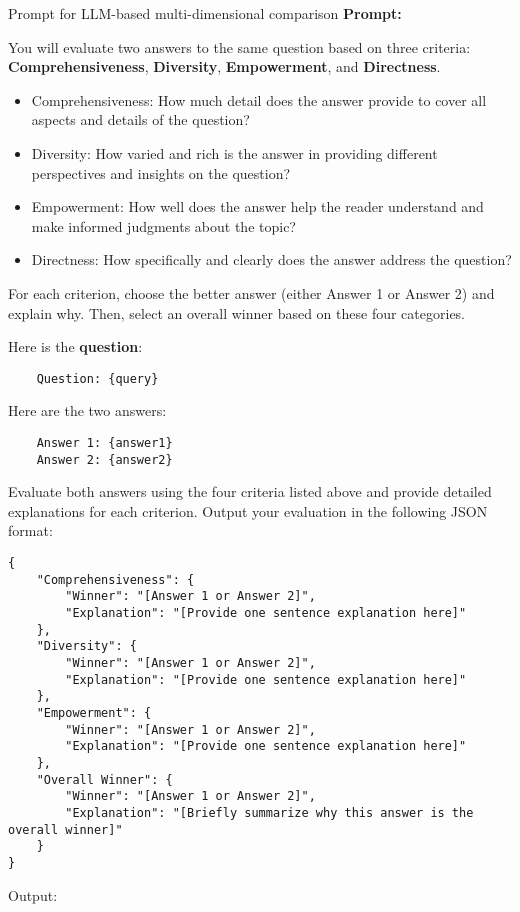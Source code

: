 \begin{figure*}[t] 
\begin{AIbox}{Prompt for LLM-based multi-dimensional comparison}
{\bf Prompt:} \\
{%
You will evaluate two answers to the same question based on three criteria: {\bf Comprehensiveness}, {\bf Diversity}, {\bf Empowerment}, and {\bf Directness}.
\begin{itemize}
    \item Comprehensiveness: How much detail does the answer provide to cover all aspects and details of the question?
    \item Diversity: How varied and rich is the answer in providing different perspectives and insights on the question?
    \item Empowerment: How well does the answer help the reader understand and make informed judgments about the topic?
    \item Directness: How specifically and clearly does the answer address the question?
\end{itemize}

For each criterion, choose the better answer (either Answer 1 or Answer 2) and explain why. Then, select an overall winner based on these four categories.

Here is the {\bf question}: 
\begin{verbatim}
    Question: {query}
\end{verbatim}

Here are the two answers:
\begin{verbatim}
    Answer 1: {answer1}
    Answer 2: {answer2}
\end{verbatim}

Evaluate both answers using the four criteria listed above and provide detailed explanations for each criterion. Output your evaluation in the following JSON format:
\begin{verbatim}
{
    "Comprehensiveness": {
        "Winner": "[Answer 1 or Answer 2]",
        "Explanation": "[Provide one sentence explanation here]"
    },
    "Diversity": {
        "Winner": "[Answer 1 or Answer 2]",
        "Explanation": "[Provide one sentence explanation here]"
    },
    "Empowerment": {
        "Winner": "[Answer 1 or Answer 2]",
        "Explanation": "[Provide one sentence explanation here]"
    },
    "Overall Winner": {
        "Winner": "[Answer 1 or Answer 2]",
        "Explanation": "[Briefly summarize why this answer is the overall winner]"
    }
}
\end{verbatim}

Output:

}

\end{AIbox} 
\caption{The prompt for the evaluation of abstract QA.}
\label{fig:eval_summary}
\end{figure*}




